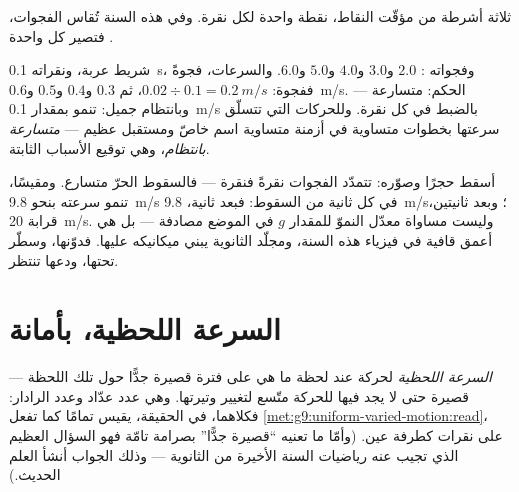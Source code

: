 \begin{omfigure}

{\small ثلاثة أشرطة من مؤقّت النقاط، نقطة واحدة لكل نقرة. وفي
هذه السنة تُقاس الفجوات، فتصير كل واحدة .}
\end{omfigure}

\begin{example}\label{ex:g9:uniform-varied-motion:worked}
شريط عربة، ونقراته \qty{0.1}{s}، وفجواته : $2.0$
و$3.0$ و$4.0$ و$5.0$ و$6.0$. والسرعات، فجوةً ففجوة:
$0.02 \div 0.1 = \qty{0.2}{m/s}$، ثم $0.3$ و$0.4$ و$0.5$
و\qty{0.6}{m/s}. الحكم: متسارعة --- وبانتظام جميل: 
تنمو بمقدار \qty{0.1}{m/s} بالضبط في كل نقرة. وللحركات التي
تتسلّق سرعتها بخطوات متساوية في أزمنة متساوية اسم خاصّ ومستقبل
عظيم --- \emph{متسارعة بانتظام}، وهي توقيع الأسباب الثابتة.
\end{example}

\begin{example}\label{ex:g9:uniform-varied-motion:freefall}
أسقط حجرًا وصوّره: تتمدّد الفجوات نقرةً فنقرة --- فالسقوط الحرّ
متسارع. ومقيسًا، تنمو سرعته بنحو \qty{9.8}{m/s} في كل ثانية من
السقوط: فبعد ثانية، \qty{9.8}{m/s}؛ وبعد ثانيتين، قرابة
\qty{20}{m/s}. وليست مساواة معدّل النموّ للمقدار $g$ في الموضع
مصادفة --- بل هي أعمق قافية في فيزياء هذه السنة، ومجلّد
الثانوية يبني ميكانيكه عليها. فدوّنها، وسطّر تحتها، ودعها
تنتظر.
\end{example}

\section{السرعة اللحظية، بأمانة}

\begin{definition}\label{def:g9:uniform-varied-motion:instant}
\emph{السرعة اللحظية} لحركة عند لحظة ما هي
 على فترة قصيرة جدًّا حول تلك اللحظة --- قصيرة
حتى لا يجد فيها للحركة متّسع لتغيير وتيرتها. وهي عدد عدّاد
 وعدد الرادار: فكلاهما، في الحقيقة، يقيس تمامًا كما
تفعل \cref{met:g9:uniform-varied-motion:read}، على نقرات
كطرفة عين. (وأمّا ما تعنيه ``قصيرة جدًّا'' بصرامة تامّة فهو
السؤال العظيم الذي تجيب عنه رياضيات السنة الأخيرة من الثانوية
--- وذلك الجواب أنشأ العلم الحديث.)
\end{definition}

